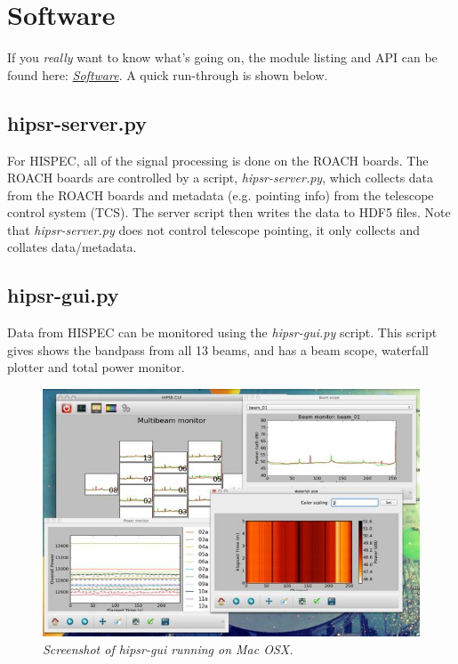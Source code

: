 \documentclass[letterpaper,10pt,english]{sphinxmanual}
\begin{document}
\section{Software}
\label{user_guide:software}
If you \emph{really} want to know
what's going on, the module listing and API can be found here: {\hyperref[software:software-chapter]{\emph{Software}}}.
A quick run-through is shown below.


\subsection{hipsr-server.py}
\label{user_guide:hipsr-server-py}
For HISPEC, all of the signal processing is done on the ROACH boards. The ROACH boards are
controlled by a script, \emph{hipsr-server.py}, which collects data from the ROACH boards and
metadata (e.g. pointing info) from the telescope control system (TCS). The server script then
writes the data to HDF5 files. Note that \emph{hipsr-server.py} does not control telescope pointing,
it only collects and collates data/metadata.


\subsection{hipsr-gui.py}
\label{user_guide:hipsr-gui-py}
Data from HISPEC can be monitored using the \emph{hipsr-gui.py} script. This script gives shows the
bandpass from all 13 beams, and has a beam scope, waterfall plotter and total power monitor.
\begin{figure}[htbp]
\centering
\capstart

\includegraphics{hipsr-gui.jpg}
\caption{\emph{Screenshot of hipsr-gui running on Mac OSX.}}\end{figure}
\end{document}
